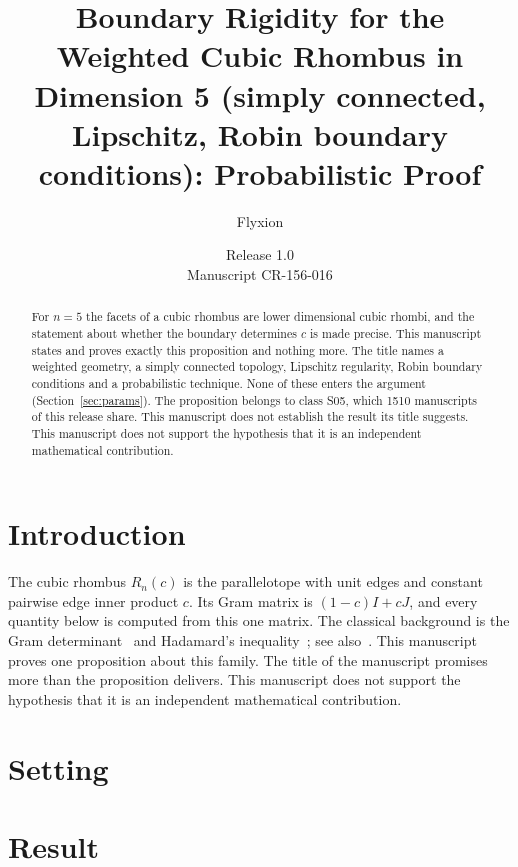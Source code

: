 \documentclass[11pt]{article}
\title{Boundary Rigidity for the Weighted Cubic Rhombus in Dimension 5 (simply connected, Lipschitz, Robin boundary conditions): Probabilistic Proof}
\author{Flyxion}
\date{Release 1.0\\ Manuscript CR-156-016}
\begin{document}
\maketitle
\begin{abstract}
For $n=5$ the facets of a cubic rhombus are lower dimensional cubic rhombi, and the statement about whether the boundary determines $c$ is made precise. This manuscript states and proves exactly this proposition and nothing more. The title names a weighted geometry, a simply connected topology, Lipschitz regularity, Robin boundary conditions and a probabilistic technique. None of these enters the argument (Section~\ref{sec:params}). The proposition belongs to class S05, which 1510 manuscripts of this release share. This manuscript does not establish the result its title suggests. This manuscript does not support the hypothesis that it is an independent mathematical contribution.
\end{abstract}

\section{Introduction}
The cubic rhombus $R_n(c)$ is the parallelotope with unit edges and constant pairwise edge inner product $c$. Its Gram matrix is $(1-c)I+cJ$, and every quantity below is computed from this one matrix. The classical background is the Gram determinant~\cite{gram} and Hadamard's inequality~\cite{hadamard}; see also~\cite{hj}.
This manuscript proves one proposition about this family. The title of the manuscript promises more than the proposition delivers. This manuscript does not support the hypothesis that it is an independent mathematical contribution.

\section{Setting}


\section{Result}

\end{document}
